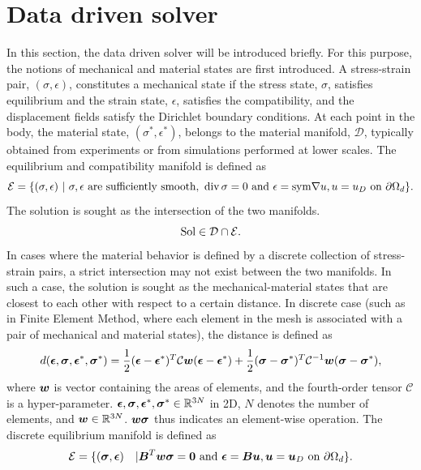 \documentclass[10pt,review]{cas-sc}
\begin{document}
\section{Data driven solver}
In this section, the data driven solver \cite{Kirchdoerfer2016} will be introduced briefly. For this purpose, the notions of mechanical and material states are first introduced. A stress-strain pair, $(\sigma,\epsilon)$, constitutes a mechanical state if the stress state, $\sigma$, satisfies equilibrium and the strain state, $\epsilon$, satisfies the compatibility, and the displacement fields satisfy the Dirichlet boundary conditions. At each point in the body, the material state, $(\sigma^*,\epsilon^*)$, belongs to the material manifold, $\mathcal{D}$, typically obtained from experiments or from simulations performed at lower scales. The equilibrium and compatibility manifold is defined as 
\begin{equation}
	\mathcal{E} = \{ (\sigma,\epsilon) \text{ }|\text{ } \sigma,\epsilon \text{ are sufficiently smooth, } \operatorname{div} \sigma = 0 \text{ and } \epsilon=\mathrm{sym}\nabla u, u=u_D \text{ on } \partial \Omega_d  \}.
\end{equation}
The solution is sought as the intersection of the two manifolds.
\begin{equation}
	{\rm Sol} \in \mathcal{D} \cap \mathcal{E}.
\end{equation}
In cases where the material behavior is defined by a discrete collection of stress-strain pairs, a strict intersection may not exist between the two manifolds. In such a case, the solution is sought as the mechanical-material states that are closest to each other with respect to a certain distance. In discrete case (such as in Finite Element Method, where each element in the mesh is associated with a pair of mechanical and material states), the distance is defined as  
\begin{equation}
	d(\mbox{\boldmath $\epsilon$},\mbox{\boldmath $\sigma$},\mbox{\boldmath $\epsilon$}^*,\mbox{\boldmath $\sigma$}^*) = \frac{1}{2}(\mbox{\boldmath $\epsilon$} - \mbox{\boldmath $\epsilon$}^*)^T\mathcal{C} \mbox{\boldmath $w$}(\mbox{\boldmath $\epsilon$} - \mbox{\boldmath $\epsilon$}^*) + \frac{1}{2}(\mbox{\boldmath $\sigma$} - \mbox{\boldmath $\sigma$}^*)^T\mathcal{C}^{-1}\mbox{\boldmath $w$}(\mbox{\boldmath $\sigma$} - \mbox{\boldmath $\sigma$}^*), \label{distance_func_orig}
\end{equation}
where $\mbox{\boldmath $w$}$ is vector containing the areas of elements, and the fourth-order tensor $\mathcal{C}$ is a hyper-parameter. $\mbox{\boldmath $\epsilon$},\mbox{\boldmath $\sigma$},\mbox{\boldmath $\epsilon$}^*, \mbox{\boldmath $\sigma$}^* \in \mathbb{R}^{3N}$ in 2D, $N$ denotes the number of elements, and $\mbox{\boldmath $w$} \in \mathbb{R}^{3N}$. $\mbox{\boldmath $w$} \mbox{\boldmath $\sigma$}$ thus indicates an element-wise operation. The discrete equilibrium manifold is defined as  
\begin{equation}
	\mathcal{E} = \{ (\mbox{\boldmath $\sigma$},\mbox{\boldmath $\epsilon$}) \quad | \mbox{\boldmath $B$}^T \mbox{\boldmath $w$}\mbox{\boldmath $\sigma$} = \boldsymbol{0} \text{ and } \mbox{\boldmath $\epsilon$}=\mbox{\boldmath $B$} \mbox{\boldmath $u$}, \mbox{\boldmath $u$}=\mbox{\boldmath $u$}_D \text{ on } \partial \Omega_d  \}.
\end{equation}
\end{document}
